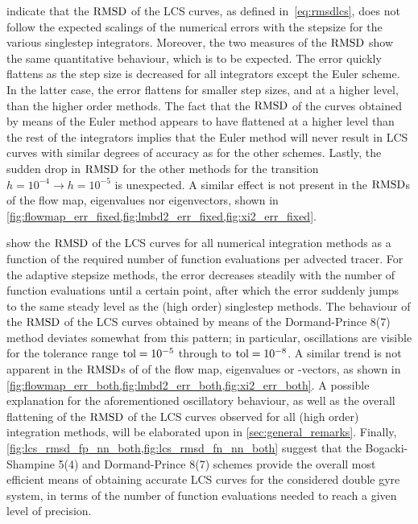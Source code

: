  indicate that the
$\operatorname{RMSD}$ of the LCS curves, as defined in~\cref{eq:rmsdlcs}, does not follow the
expected scalings of the numerical errors with the stepsize for the various
singlestep integrators. Moreover, the two measures of the $\operatorname{RMSD}$ show the same
quantitative behaviour, which is to be expected. The error quickly flattens as
the step size is decreased for all integrators except the Euler scheme. In the
latter case, the error flattens for smaller step sizes, and at a higher level,
than the higher order methods. The fact that the $\operatorname{RMSD}$  of the curves obtained
by means of the Euler method appears to have flattened  at a higher level than
the rest of the integrators implies that the Euler method will never result in
LCS curves with similar degrees of accuracy as for the other schemes. Lastly,
the sudden drop in $\operatorname{RMSD}$ for the other methods for the transition
$h=10^{-4}\rightarrow{h=10^{-5}}$ is unexpected. A similar effect is not present
in the $\operatorname{RMSD}$s of the flow map, eigenvalues nor eigenvectors, shown in
\cref{fig:flowmap_err_fixed,fig:lmbd2_err_fixed,fig:xi2_err_fixed}.



 show the $\operatorname{RMSD}$ of the
LCS curves for all numerical integration methods as a function of the required
number of function evaluations per advected tracer. For the adaptive stepsize
methods, the error decreases steadily with the number of function evaluations
until a certain point, after which the error suddenly jumps to the same steady
level as the (high order) singlestep methods. The behaviour of the $\operatorname{RMSD}$ of
the LCS curves obtained by means of the Dormand-Prince 8(7) method deviates
somewhat from this pattern; in particular, oscillations are visible for the
tolerance range $\textnormal{tol}=10^{-5}$ through to
$\textnormal{tol}=10^{-8}$. A similar trend is not apparent in the $\operatorname{RMSD}$s of
of the flow map, eigenvalues or -vectors, as shown in
\cref{fig:flowmap_err_both,fig:lmbd2_err_both,fig:xi2_err_both}. A possible
explanation for the aforementioned oscillatory behaviour, as well as the
overall flattening of the $\operatorname{RMSD}$ of the LCS curves observed for all (high
order) integration methods, will be elaborated upon in
\cref{sec:general_remarks}. Finally,
\cref{fig:lcs_rmsd_fp_nn_both,fig:lcs_rmsd_fn_nn_both} suggest that the
Bogacki-Shampine 5(4) and Dormand-Prince 8(7) schemes provide the overall most
efficient means of obtaining accurate LCS curves for the considered double gyre
system, in terms of the number of function evaluations needed to reach a given
level of precision.

